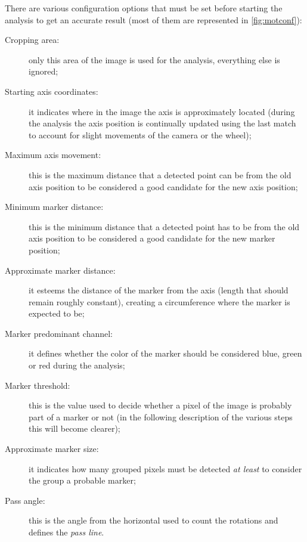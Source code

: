 \beforelist* There are various configuration options that must be set before
starting the analysis to get an accurate result (most of them are represented
in \autoref{fig:motconf}):
\begin{description}
  \item[Cropping area:] only this area of the image is used for the analysis,
    everything else is ignored;
  \item[Starting axis coordinates:] it indicates where in the image the axis
    is approximately located (during the analysis the axis position is
    continually updated using the last match to account for slight movements of
    the camera or the wheel);
  \item[Maximum axis movement:] this is the maximum distance that a detected
    point can be from the old axis position to be considered a good candidate
    for the new axis position;
  \item[Minimum marker distance:] this is the minimum distance that a detected
    point has to be from the old axis position to be considered a good candidate
    for the new marker position;
  \item[Approximate marker distance:] it esteems the distance of the marker from
    the axis (length that should remain roughly constant), creating a
    circumference where the marker is expected to be;
  \item[Marker predominant channel:] it defines whether the color of the marker
    should be considered blue, green or red during the analysis;
  \item[Marker threshold:] this is the value used to decide whether a pixel of
    the image is probably part of a marker or not (in the following description
    of the various steps this will become clearer);
  \item[Approximate marker size:] it indicates how many grouped pixels must be
    detected \emph{at least} to consider the group a probable marker;
  \item[Pass angle:] this is the angle from the horizontal used to count the
    rotations and defines the \emph{pass line}. 
\end{description}
\afterlist*

